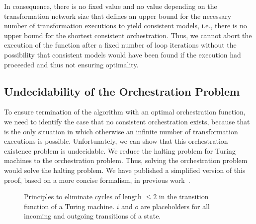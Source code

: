In consequence, there is no fixed value and no value depending on the transformation network size that defines an upper bound for the necessary number of transformation executions to yield consistent models, i.e., there is no upper bound for the shortest consistent orchestration.
Thus, we cannot abort the execution of the  function after a fixed number of loop iterations without the possibility that consistent models would have been found if the execution had proceeded and thus not ensuring optimality.


\subsection{Undecidability of the Orchestration Problem}

To ensure termination of the  algorithm with an optimal orchestration function, we need to identify the case that no consistent orchestration exists, because that is the only situation in which otherwise an infinite number of transformation executions is possible.
Unfortunately, we can show that this orchestration existence problem is undecidable.
We reduce the halting problem for Turing machines to the orchestration problem.
Thus, solving the orchestration problem would solve the halting problem.
We have published a simplified version of this proof, based on a more concise formalism, in previous work~.

\begin{figure}
    \centering
    
    \caption[Cycle elimination in Turing machine transition functions]{Principles to eliminate cycles of length $\leq 2$ in the transition function of a Turing machine. $i$ and $o$ are placeholders for all incoming and outgoing transitions of a state.}
    \label{fig:orchestration:cycle_elimination}
\end{figure}

